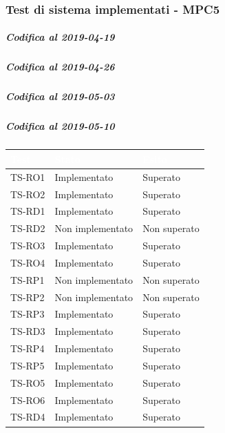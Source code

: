 \subsubsection{Test di sistema implementati - MPC5}
\subparagraph{Codifica al 2019-04-19}


\subparagraph{Codifica al 2019-04-26}


\subparagraph{Codifica al 2019-05-03}


\subparagraph{Codifica al 2019-05-10}


\begin{longtable}{|>{\centering\arraybackslash}m{1.6cm}|>{\centering\arraybackslash}m{6.41cm}|>{\centering\arraybackslash}m{3.1cm}|}		
	\rowcolor{LightBlue}
	\textbf{\textcolor{white}{Test}}
	& \textbf{\textcolor{white}{Stato}}
	& \textbf{\textcolor{white}{Esito}}\\
	\hline
		\rowcolor{LightGray}
		TS-RO1
		& Implementato
		& Superato
		\\ \hline
		\rowcolor{white}
		TS-RO2
		& Implementato
		& Superato
		\\ \hline
		\rowcolor{LightGray}
		TS-RD1
		& Implementato
		& Superato
		\\ \hline
		\rowcolor{white}
		TS-RD2
		& Non implementato
		& Non superato 
		\\ \hline
		\rowcolor{LightGray}
		TS-RO3
		& Implementato
		& Superato
		\\ \hline
		\rowcolor{white}
		TS-RO4		
		& Implementato
		& Superato
		\\ \hline
		\rowcolor{LightGray}
		TS-RP1		
		& Non implementato
		& Non superato	
		\\ \hline
		\rowcolor{LightGray}
		TS-RP2		
		& Non implementato
		& Non superato	
		\\ \hline
		\rowcolor{white}
		TS-RP3		
		& Implementato
		& Superato
		\\ \hline
		\rowcolor{LightGray}
		TS-RD3		
		& Implementato
		& Superato
		\\ \hline
		\rowcolor{white}
		TS-RP4		
		& Implementato
		& Superato
		\\ \hline
		\rowcolor{LightGray}
		TS-RP5		
		& Implementato
		& Superato
		\\ \hline
		\rowcolor{white}
		TS-RO5		
		& Implementato
		& Superato
		\\ \hline
		\rowcolor{LightGray}
		TS-RO6		
		& Implementato
		& Superato
		\\ \hline
		\rowcolor{white}
		TS-RD4		
		& Implementato
		& Superato
		\\ \hline

\end{longtable}
